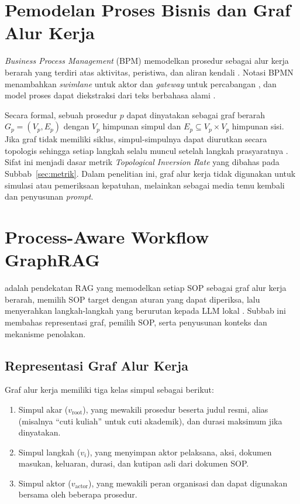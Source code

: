\section{Pemodelan Proses Bisnis dan Graf Alur Kerja}
\label{sec:bpm}
\textit{Business Process Management} (BPM) memodelkan prosedur sebagai alur kerja berarah yang terdiri atas aktivitas, peristiwa, dan aliran kendali \parencite{dumas2018fundamentals}. Notasi BPMN menambahkan \textit{swimlane} untuk aktor dan \textit{gateway} untuk percabangan \parencite{omg2011bpmn}, dan model proses dapat diekstraksi dari teks berbahasa alami \parencite{friedrich2011process}.

Secara formal, sebuah prosedur $p$ dapat dinyatakan sebagai graf berarah $G_p=(V_p,E_p)$ dengan $V_p$ himpunan simpul dan $E_p\subseteq V_p\times V_p$ himpunan sisi. Jika graf tidak memiliki siklus, simpul-simpulnya dapat diurutkan secara topologis sehingga setiap langkah selalu muncul setelah langkah prasyaratnya \parencite{kahn1962topological}. Sifat ini menjadi dasar metrik \textit{Topological Inversion Rate} yang dibahas pada Subbab~\ref{sec:metrik}. Dalam penelitian ini, graf alur kerja tidak digunakan untuk simulasi atau pemeriksaan kepatuhan, melainkan sebagai media temu kembali dan penyusunan \textit{prompt}.

\section{Process-Aware Workflow GraphRAG}
\label{sec:wgr}
\wgr{} adalah pendekatan RAG yang memodelkan setiap SOP sebagai graf alur kerja berarah, memilih SOP target dengan aturan yang dapat diperiksa, lalu menyerahkan langkah-langkah yang berurutan kepada LLM lokal \parencite{wiratama2026procedure}. Subbab ini membahas representasi graf, pemilih SOP, serta penyusunan konteks dan mekanisme penolakan.

\subsection{Representasi Graf Alur Kerja}
Graf alur kerja memiliki tiga kelas simpul sebagai berikut:
\begin{enumerate}
\item Simpul akar ($v_{\text{root}}$), yang mewakili prosedur beserta judul resmi, alias (misalnya ``cuti kuliah'' untuk cuti akademik), dan durasi maksimum jika dinyatakan.
\item Simpul langkah ($v_i$), yang menyimpan aktor pelaksana, aksi, dokumen masukan, keluaran, durasi, dan kutipan asli dari dokumen SOP.
\item Simpul aktor ($v_{\text{actor}}$), yang mewakili peran organisasi dan dapat digunakan bersama oleh beberapa prosedur.
\end{enumerate}

